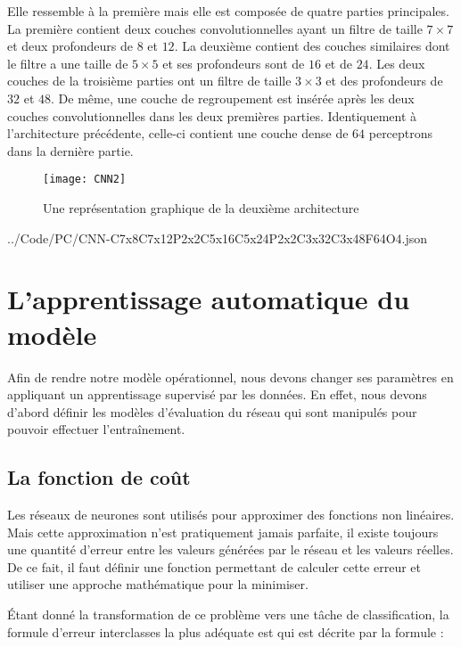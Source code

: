 Elle ressemble à la première mais elle est composée de quatre
parties principales. La première contient deux couches convolutionnelles ayant
un filtre de taille $7 \times 7$ et deux profondeurs de $8$ et $12$.
La deuxième contient des couches similaires dont le filtre a une taille de $5 \times 5$
et ses profondeurs sont de $16$ et de $24$. Les deux couches de la troisième parties ont
un filtre de taille $3 \times 3$ et des profondeurs de $32$ et $48$.
De même, une couche de regroupement est insérée après les deux couches
convolutionnelles dans les deux premières parties. Identiquement à l'architecture
précédente, celle-ci contient une couche dense de $64$ perceptrons dans la
dernière partie.

\begin{figure}[h]
  \centering
  \texttt{[image: CNN2]}
  \caption{Une représentation graphique de la deuxième architecture}
\end{figure}

\vspace{2.5em}


{../Code/PC/CNN-C7x8C7x12P2x2C5x16C5x24P2x2C3x32C3x48F64O4.json}

\section{L'apprentissage automatique du modèle}

Afin de rendre notre modèle opérationnel, nous devons changer ses paramètres en
appliquant un apprentissage supervisé par les données. En effet, nous devons
d'abord définir les modèles d'évaluation du réseau qui sont manipulés pour pouvoir
effectuer l’entraînement.

\subsection{La fonction de coût}

Les réseaux de neurones sont utilisés pour approximer des fonctions non linéaires.
Mais cette approximation n'est pratiquement jamais parfaite, il existe toujours
une quantité d'erreur entre les valeurs générées par le réseau et les valeurs réelles.
De ce fait, il faut définir une fonction permettant de calculer cette erreur et utiliser
une approche mathématique pour la minimiser.

Étant donné la transformation de ce problème vers une tâche de classification,
la formule d'erreur interclasses la plus adéquate est 
qui est décrite par la formule :

